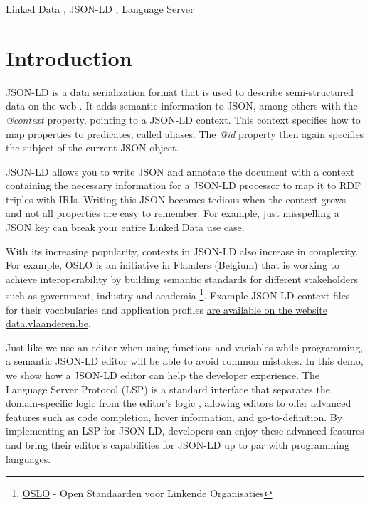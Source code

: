 \documentclass[
]{ceurart}
\begin{document}
\begin{keywords}
  Linked Data \sep 
  JSON-LD \sep
  Language Server
\end{keywords}

\maketitle

\section{Introduction}

JSON-LD is a data serialization format that is used to describe semi-structured data on the web \cite{JSON-LD-W3C}.
It adds semantic information to JSON, among others with the \textit{@context} property, pointing to a JSON-LD context.
This context specifies how to map properties to predicates, called aliases.
The \textit{@id} property then again specifies the subject of the current JSON object.

JSON-LD allows you to write JSON and annotate the document with a context containing the necessary information for a JSON-LD processor to map it to RDF triples with IRIs.
Writing this JSON becomes tedious when the context grows and not all properties are easy to remember.
For example, just misspelling a JSON key can break your entire Linked Data use case.

With its increasing popularity, contexts in JSON-LD also increase in complexity.
For example, OSLO is an initiative in Flanders (Belgium) that is working to achieve interoperability by building semantic standards for different stakeholders such as government, industry and academia \footnote{\href{https://www.vlaanderen.be/digitaal-vlaanderen/onze-oplossingen/oslo}{OSLO} - Open Standaarden voor Linkende Organisaties}.
Example JSON-LD context files for their vocabularies and application profiles \href{https://data.vlaanderen.be}{are available on the website data.vlaanderen.be}.


Just like we use an editor when using functions and variables while programming, a semantic JSON-LD editor will be able to avoid common mistakes.
In this demo, we show how a JSON-LD editor can help the developer experience.
The Language Server Protocol (LSP) is a standard interface that separates the domain-specific logic from the editor's logic \cite{LSP-Multi}, allowing editors to offer advanced features such as code completion, hover information, and go-to-definition.
By implementing an LSP for JSON-LD, developers can enjoy these advanced features and bring their editor's capabilities for JSON-LD up to par with programming languages.
\end{document}
